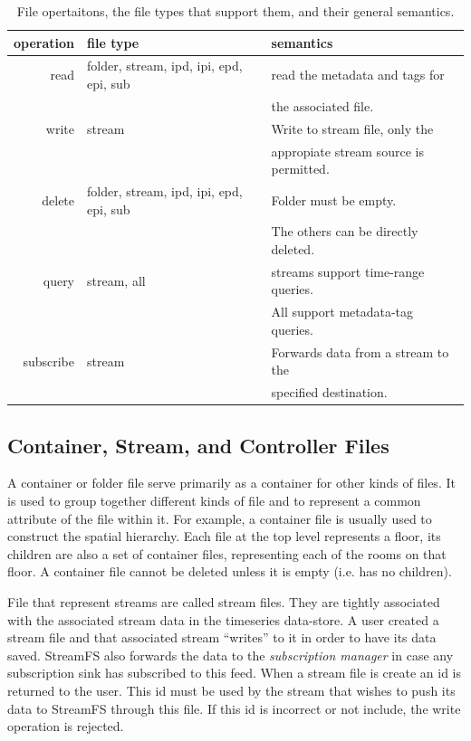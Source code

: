 \begin{table}[h]
\begin{center}
\begin{tabular}{| r | l | l |}
	\hline
	\textbf{operation} & \textbf{file type} & \textbf{semantics} \\ \hline
	read & folder, stream, ipd, ipi, epd, epi, sub & read the metadata and tags for \\
		 &										   & the associated file. \\ \hline
	write &  stream & Write to stream file, only the \\ 
		  & 		& appropiate stream source is permitted.\\ \hline
	delete & folder, stream, ipd, ipi, epd, epi, sub & Folder must be empty.  \\
		   & 										 & The others can be directly deleted. \\ \hline
	query &  stream, all & streams support time-range queries.  \\
		  &			     & All support metadata-tag queries.\\ \hline
	subscribe & stream & Forwards data from a stream to the\\
			  &		   & specified destination.\\
	\hline
\end{tabular}
\caption{File opertaitons, the file types that support them, and their general semantics.}
\label{tab:semantics}
\end{center}
\end{table}

\subsection{Container, Stream, and Controller Files}
A container or folder file serve primarily as a container for other kinds of files.  It is used to group together different kinds of file and
to represent a common attribute of the file within it.  For example, a container file is usually used to construct the spatial hierarchy.
Each file at the top level represents a floor, its children are also a set of container files, representing each of the rooms on that floor.
A container file cannot be deleted unless it is empty (i.e. has no children).

File that represent streams are called stream files.  They are tightly associated with the associated stream data in the timeseries data-store.
A user created a stream file and that associated stream ``writes'' to it in order to have its data saved.  StreamFS also forwards the
data to the \emph{subscription manager} in case any subscription sink has subscribed to this feed.  When a stream file is create an id is 
returned to the user.  This id must be used by the stream that wishes to push its data to StreamFS through this file.  If this id is incorrect
or not include, the write operation is rejected.


